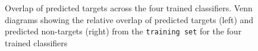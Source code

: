 \begin{figure}[H]
    \caption{Overlap of predicted targets across the four trained classifiers. Venn diagrams showing the relative overlap of predicted targets (left) and predicted non-targets (right) from the \texttt{training set} for the four trained classifiers \label{fig:OT_venn}}
\end{figure}

